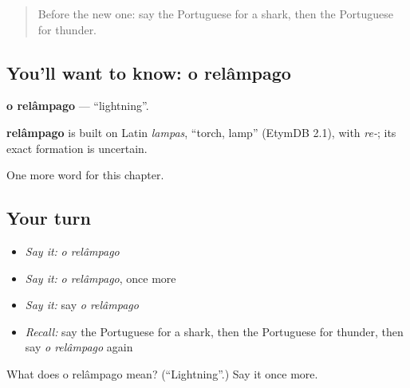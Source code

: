 \begin{quote}
Before the new one: say the Portuguese for a shark, then the Portuguese for thunder.
\end{quote}

\subsection*{You'll want to know: o relâmpago}
\textbf{o relâmpago} — \textquotedblleft{}lightning\textquotedblright{}.

\begin{cousinweb}
\textbf{relâmpago} is built on Latin \emph{lampas}, \textquotedblleft{}torch, lamp\textquotedblright{} (EtymDB 2.1), with \emph{re-}; its exact formation is uncertain.
\end{cousinweb}

\begin{grammarlens}[title={What you've built}]
One more word for this chapter.
\end{grammarlens}

\subsection*{Your turn}
\begin{itemize}
\raggedright
  \item \emph{Say it:} \emph{o relâmpago}
  \item \emph{Say it:} \emph{o relâmpago}, once more
  \item \emph{Say it:} say \emph{o relâmpago}
  \item \emph{Recall:} say the Portuguese for a shark, then the Portuguese for thunder, then say \emph{o relâmpago} again
\end{itemize}

\begin{tcolorbox}[breakable,colback=teal!4,colframe=teal!35!black,title={Before you move on}]
What does o relâmpago mean? (\textquotedblleft{}Lightning\textquotedblright{}.) Say it once more.
\end{tcolorbox}
